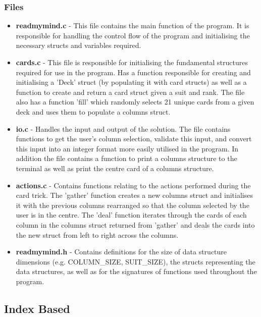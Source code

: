 \documentclass[11]{article}
\begin{document}
		\subsubsection{Files}
				\begin{itemize}
					\item \textbf{readmymind.c} - This file contains the main function of the program. It is responsible for handling the control flow of the program and initialising the necessary structs and variables required.
					\item \textbf{cards.c} - This file is responsible for initialising the fundamental structures required for use in the program. Has a function responsible for creating and initialising a 'Deck' struct (by populating it with card structs) as well as a function to create and return a card struct given a suit and rank. The file also has a function 'fill' which randomly selects 21 unique cards from a given deck and uses them to populate a columns struct.
					\item \textbf{io.c} - Handles the input and output of the solution. The file contains functions to get the user's column selection, validate this input, and convert this input into an integer format more easily utilised in the program. In addition the file contains a function to print a columns structure to the terminal as well as print the centre card of a columns structure.
					\item \textbf{actions.c} - Contains functions relating to the actions performed during the card trick. The 'gather' function creates a new columns struct and initialises it with the previous columns rearranged so that the column selected by the user is in the centre. The 'deal' function iterates through the cards of each column in the columns struct returned from 'gather' and deals the cards into the new struct from left to right across the columns.
					\item \textbf{readmymind.h} - Contains definitions for the size of data structure dimensions (e.g. COLUMN\_SIZE, SUIT\_SIZE), the structs representing the data structures, as well as for the signatures of functions used throughout the program.
				\end{itemize}
		\subsection{Index Based}
			
			\newpage
\end{document}

